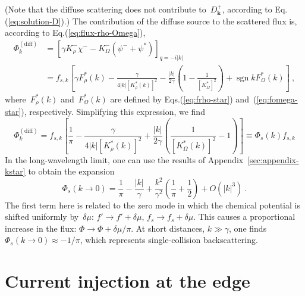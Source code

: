 \documentclass[preprint,aps,eqsecnum]{revtex4-1}
\newcommand{\fplus}[1]{{#1}^{+}}
\newcommand{\fminus}[1]{{#1}^{-}}
\newcommand{\sgn}{\mathop{\mathrm{sgn}}\nolimits}
\begin{document}
(Note that the diffuse scattering does not contribute to~$\fplus{D}_{\bm k}$,
according to Eq.(\ref{eq:solution-D}).) The contribution of the diffuse source to
the scattered flux is, according to Eq.(\ref{eq:flux-rho-Omega}),
\begin{align}
  \label{eq:phi-chi-psi}
  \Phi^\mathrm{(diff)}_k &=
  \left[\gamma \fminus{K}_\rho \fminus{\chi}
  - \fminus{K}_\Omega \left(\fminus{\psi}
                       + \psi^\ast\right)\right]_{q = -i |k|} \\
  &= f_{s, k} \left[\gamma F_\rho^\ast(k)
   - \frac{\gamma}{4|k| \left[K_\rho^\ast(k)\right]^2}
  - \frac{|k|}{2\gamma}\left(1 - \frac{1}{\left[K_\Omega^\ast\right]^2} \right)
   + \sgn k F_\Omega^\ast(k)\right]
   \nonumber
  \ ,
\end{align}
where~$F_\rho^\ast(k)$ and~$F_\Omega^\ast(k)$ are defined by
Eqs.(\ref{eq:frho-star}) and~(\ref{eq:fomega-star}), respectively.
Simplifying this expression, we find
\begin{equation}
  \label{eq:phi-diff}
  \Phi^\mathrm{(diff)}_k
  = f_{s, k} \left[\frac{1}{\pi}
    - \frac{\gamma}{4|k| \left[K_\rho^\ast(k)\right]^2}
  + \frac{|k|}{2\gamma} \left(\frac{1}{\left[K_\Omega^\ast(k)\right]^2}
  - 1\right) \right] \equiv \Phi_s(k) f_{s, k}
\end{equation}
In the long-wavelength limit, one can  use  the results of
Appendix~\ref{sec:appendix-kstar} to obtain the expansion
\begin{equation}
  \label{eq:phi-s-low}
  \Phi_s(k\to 0) = \frac{1}{\pi} - \frac{|k|}{\gamma} + \frac{k^2}{\gamma^2}
  \left(\frac{1}{\pi} + \frac{1}{2}\right)
  + O(|k|^3)
  \ . 
\end{equation}
The first term here is related to the zero mode in which the chemical
potential is shifted uniformly by~$\delta \mu$: 
$f' \to f' + \delta\mu$, $f_s \to f_s +  \delta\mu$. This causes
a proportional increase in the flux: $\Phi \to \Phi + \delta\mu/\pi$.
At short distances, $k \gg \gamma$, one finds~$\Phi_s(k\to0) \approx - 1/\pi$,
which represents single-collision backscattering. 

\section{Current injection at the edge}
\label{sec:boundary-src}
\end{document}
